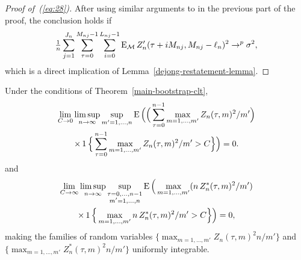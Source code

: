 \documentclass[11pt]{article}
\begin{document}
\begin{proof}[Proof of~(\ref{eq:28})]
  After using similar arguments to in the previous part of the proof,
  the conclusion holds if
  \begin{equation*}
    \tfrac{1}{n} \sum_{j=1}^{J_n} \sum_{\tau=0}^{M_{nj}-1} \sum_{i=0}^{L_{nj} - 1}
    \operatorname{E}_{\mathcal{M}} Z_n'(\tau + i M_{nj}, M_{nj} - \ell_n)^2 \to^p \sigma^2,
  \end{equation*}
  which is a direct implication of Lemma~\ref{dejong-restatement-lemma}.
\end{proof}

\begin{lem}\label{bootstrapped-zsq-uniform-integrability-lemma}
  Under the conditions of Theorem~\ref{main-bootstrap-clt},
  \begin{multline}\label{eq:35}
    \lim_{C \to 0} \limsup_{n \to \infty} \sup_{m' = 1,\dots,n}
    \operatorname{E}\Big(\Big(\sum_{\tau=0}^{n-1} \max_{m=1,\dots,m'} Z_n(\tau, m)^2 / m'\Big) \\
    \times\operatorname{1}\Big\{\sum_{\tau=0}^{n-1} \max_{m=1,\dots,m'} Z_n(\tau, m)^2 / m' > C\Big\}\Big) = 0.
  \end{multline}
  and
  \begin{multline}\label{eq:30}
    \lim_{C \to \infty} \limsup_{n \to \infty} \sup_{\substack{\tau = 0,\dots,n-1 \\ m'=1,\dots,n}}
    \operatorname{E}\Big(\max_{m = 1,\dots,m'} (n \, Z^*_n(\tau, m)^2 / m') \\
    \times \operatorname{1}\Big\{\max_{m = 1,\dots,m'} n \, Z^*_n(\tau, m)^2 / m' > C\Big\}\Big)
    = 0,
  \end{multline}
  making the families of random variables $\{\max_{m=1,\dots,m'}
  Z_n(\tau, m)^2 n / m'\}$ and $\{\max_{m=1,\dots,m'}
  Z^{*}_n(\tau, m)^2 n / m'\}$ uniformly integrable.
\end{lem}
\end{document}
